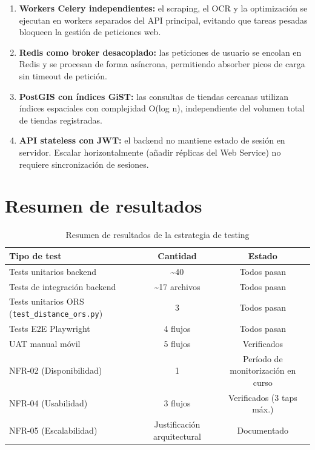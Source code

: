 \begin{enumerate}
  \item \textbf{Workers Celery independientes:} el scraping, el OCR y la optimizaci\'on se ejecutan
    en workers separados del API principal, evitando que tareas pesadas bloqueen la gesti\'on de
    peticiones web.

  \item \textbf{Redis como broker desacoplado:} las peticiones de usuario se encolan en Redis y se
    procesan de forma as\'incrona, permitiendo absorber picos de carga sin timeout de petici\'on.

  \item \textbf{PostGIS con \'indices GiST:} las consultas de tiendas cercanas utilizan \'indices
    espaciales con complejidad O(log n), independiente del volumen total de tiendas registradas.

  \item \textbf{API stateless con JWT:} el backend no mantiene estado de sesi\'on en servidor.
    Escalar horizontalmente (a\~nadir r\'eplicas del Web Service) no requiere sincronizaci\'on de
    sesiones.
\end{enumerate}

\section{Resumen de resultados}\label{sec:resumen-pruebas}

\begin{table}[h]
\caption{Resumen de resultados de la estrategia de testing}
\label{tab:resumen-pruebas}
\centering
\begin{tabular}{|l|c|c|}
\hline
\textbf{Tipo de test} & \textbf{Cantidad} & \textbf{Estado} \\
\hline
Tests unitarios backend & \textasciitilde{}40 & Todos pasan \\
Tests de integraci\'on backend & \textasciitilde{}17 archivos & Todos pasan \\
Tests unitarios ORS (\texttt{test\_distance\_ors.py}) & 3 & Todos pasan \\
Tests E2E Playwright & 4 flujos & Todos pasan \\
UAT manual m\'ovil & 5 flujos & Verificados \\
NFR-02 (Disponibilidad) & 1 & Per\'iodo de monitorizaci\'on en curso \\
NFR-04 (Usabilidad) & 3 flujos & Verificados (3 taps m\'ax.) \\
NFR-05 (Escalabilidad) & Justificaci\'on arquitectural & Documentado \\
\hline
\end{tabular}
\end{table}

